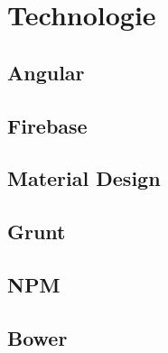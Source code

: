 \chapter{Technologie}
\label{chap_2}
\section{Angular}
\section{Firebase}
\section{Material Design}
\section{Grunt}
\section{NPM}
\section{Bower}
